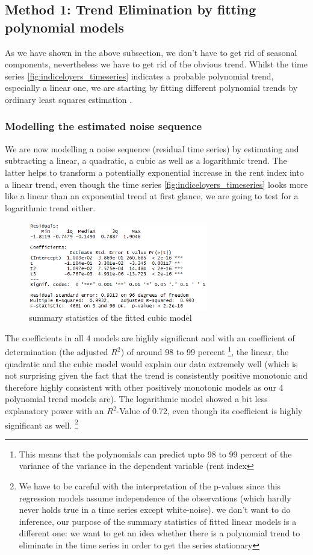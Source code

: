 \documentclass[11pt,a4paper]{article}
\begin{document}
\subsection{Method 1: Trend Elimination by fitting polynomial models}
As we have shown in the above subsection, we don't have to get rid of seasonal components, nevertheless we have to get rid of the obvious trend. Whilst the time series \ref{fig:indiceloyers_timeseries} indicates a probable polynomial trend, especially a linear one, we are starting by fitting different polynomial trends by ordinary least squares estimation \citep{ols}.\\
\subsubsection{Modelling the estimated noise sequence}
We are now modelling a noise sequence (residual time series) by estimating and subtracting a linear, a quadratic, a cubic as well as a logarithmic trend. The latter  helps to transform a potentially exponential increase in the rent index into a linear trend, even though the time series \ref{fig:indiceloyers_timeseries} looks more like a linear than an exponential trend at first glance, we are going to test for a logarithmic trend either.
\\
\begin{figure}[!htb]
\centering
\includegraphics[angle=0,
width=0.7\textwidth]{summary_cubicmodel}
\caption{summary statistics of the fitted cubic model\label{fig:summary_cubicmodel}}
\end{figure}
The coefficients in all 4 models are highly significant and with an coefficient of determination (the adjusted $R^2$) of around 98 to 99 percent \footnote{This means that the polynomials can predict upto 98 to 99 percent of the variance of the variance in the dependent variable (rent index}, the linear, the quadratic and the cubic model would explain our data extremely well (which is not surprising given the fact that the trend is consistently positive monotonic and therefore highly consistent with other positively monotonic models as our 4 polynomial trend models are).
The logarithmic model showed a bit less explanatory power with an $R^2$-Value of 0.72, even though its coefficient is highly significant as well. \footnote{We have to be careful with the interpretation of the p-values since this regression models assume independence of the observations (which hardly never holds true in a time series except white-noise). we don't want to do inference, our purpose of the summary statistics of fitted linear models is a different one: we want to get an idea whether there is a polynomial trend to eliminate in the time series in order to get the series stationary}
\end{document}
